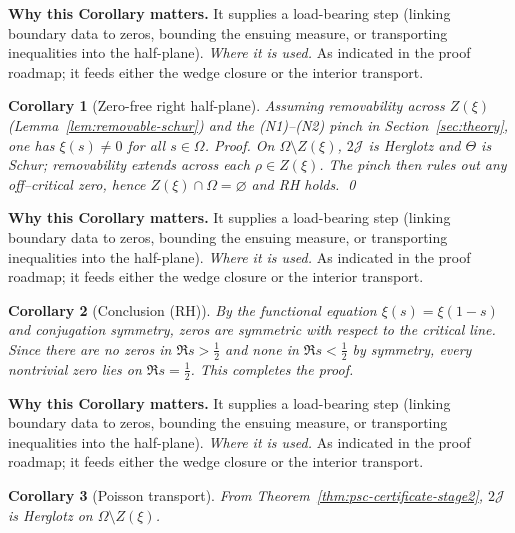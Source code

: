 \documentclass[11pt]{article}
\newtheorem{corollary}{Corollary}[section]
\theoremstyle{definition}
\theoremstyle{remark}
\begin{document}




\vspace{1.0cm}
\noindent\textbf{Why this Corollary matters.} It supplies a load-bearing step (linking boundary data to zeros, bounding the ensuing measure, or transporting inequalities into the half-plane).
\noindent\textit{Where it is used.} As indicated in the proof roadmap; it feeds either the wedge closure or the interior transport.
\begin{corollary}[Zero-free right half-plane]
  Assuming removability across $Z(\xi)$ (Lemma~\ref{lem:removable-schur}) and the (N1)–(N2)
  pinch in Section~\ref{sec:theory},   %
  one has $\xi(s)\neq 0$ for all $s\in\Omega$.
\emph{Proof.}
On $\Omega\setminus Z(\xi)$, $2\mathcal J$ is Herglotz and $\Theta$ is Schur; removability extends across each $\rho\in Z(\xi)$. The pinch then rules out any off–critical zero, hence $Z(\xi)\cap\Omega=\varnothing$ and RH holds. \qed
\end{corollary}




\vspace{1.0cm}
\noindent\textbf{Why this Corollary matters.} It supplies a load-bearing step (linking boundary data to zeros, bounding the ensuing measure, or transporting inequalities into the half-plane).
\noindent\textit{Where it is used.} As indicated in the proof roadmap; it feeds either the wedge closure or the interior transport.
\begin{corollary}[Conclusion (RH)]
By the functional equation $\xi(s)=\xi(1-s)$ and conjugation symmetry, zeros are symmetric with respect to the critical line. Since there are no zeros in $\Re s>\tfrac12$ and none in $\Re s<\tfrac12$ by symmetry, every nontrivial zero lies on $\Re s=\tfrac12$. This completes the proof.
\end{corollary}





\vspace{1.0cm}
\noindent\textbf{Why this Corollary matters.} It supplies a load-bearing step (linking boundary data to zeros, bounding the ensuing measure, or transporting inequalities into the half-plane).
\noindent\textit{Where it is used.} As indicated in the proof roadmap; it feeds either the wedge closure or the interior transport.
\begin{corollary}[Poisson transport]\label{cor:poisson-herglotz}
From Theorem~\ref{thm:psc-certificate-stage2}, $2\mathcal J$ is Herglotz on $\Omega\setminus Z(\xi)$.
\end{corollary}
\end{document}

